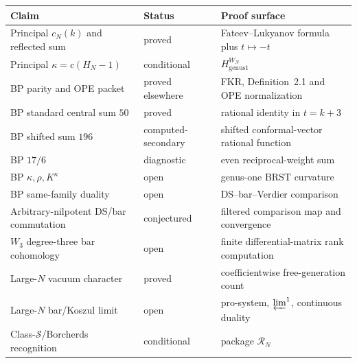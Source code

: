 \begin{center}
\small
\renewcommand{\arraystretch}{1.25}
\begin{tabular}{p{}p{}p{}}
\toprule
Claim & Status & Proof surface \\
\midrule
Principal \(c_N(k)\) and reflected sum
& proved
& Fateev--Lukyanov formula plus \(t\mapsto-t\) \\
Principal \(\kappa=c(H_N-1)\)
& conditional
& \(H_{\mathrm{genus1}}^{W_N}\) \\
BP parity and OPE packet
& proved elsewhere
& FKR, Definition~2.1 and OPE normalization \\
BP standard central sum \(50\)
& proved
& rational identity in \(t=k+3\) \\
BP shifted sum \(196\)
& computed-secondary
& shifted conformal-vector rational function \\
BP \(17/6\)
& diagnostic
& even reciprocal-weight sum \\
BP \(\kappa,\rho,K^\kappa\)
& open
& genus-one BRST curvature \\
BP same-family duality
& open
& DS--bar--Verdier comparison \\
Arbitrary-nilpotent DS/bar commutation
& conjectured
& filtered comparison map and convergence \\
\(W_3\) degree-three bar cohomology
& open
& finite differential-matrix rank computation \\
Large-\(N\) vacuum character
& proved
& coefficientwise free-generation count \\
Large-\(N\) bar/Koszul limit
& open
& pro-system, \(\varprojlim^1\), continuous duality \\
Class-\(\mathcal S\)/Borcherds recognition
& conditional
& package \(\mathcal R_N\) \\
\bottomrule
\end{tabular}
\end{center}
